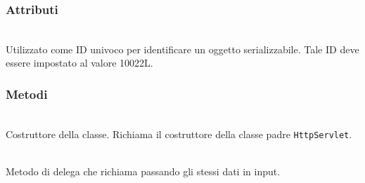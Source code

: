 \subsubsection*{Attributi}
\begin{description}
  \item{}\\
  Utilizzato come ID univoco per identificare un oggetto serializzabile. Tale ID deve essere impostato al valore 10022L.
\end{description}

\subsubsection*{Metodi}
\begin{description}
	\item{}\\
	Costruttore della classe. Richiama il costruttore della classe padre \texttt{HttpServlet}.
	
	\item{}\\
	Metodo di delega che richiama  passando gli stessi dati in input.
	

\end{description}
